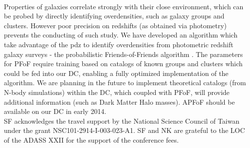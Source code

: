 \\
Properties of galaxies correlate strongly with their close environment, which can be probed by directly identifying overdensities, such as galaxy groups and clusters. However poor precision on redshifts (as obtained via photometry) prevents the conducting of such study. We have developed an algorithm which take advantage of the pdz to identify overdensities from photometric redshift galaxy surveys - the probabilistic Friends-of-Friends algorithm \citep[PFoF -][]{pfof}. The parameters for PFoF require training based on catalogs of known groups and clusters which could be fed into our DC, enabling a fully optimized implementation of the algorithm. We are planning in the future to implement theoretical catalogs (from N-body simulations) within the DC, which coupled with PFoF, will provide additional information (such as Dark Matter Halo masses). APFoF should be available on our DC in early 2014.\\


\acknowledgements SF acknowledges the travel support by the National Science Council of Taiwan under the grant NSC101-2914-I-003-023-A1. SF and NK are grateful to the LOC of the ADASS XXII for the support of the conference fees.


